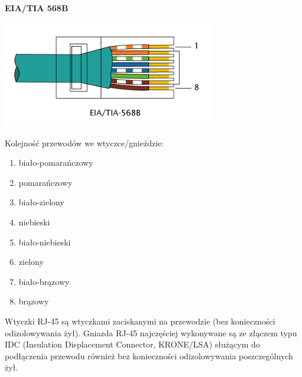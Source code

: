 \begin{minipage}{0.47\textwidth}
\begin{center}
{\noindent\large\bfseries EIA/TIA 568B}

{\noindent\includegraphics[width=0.7\textwidth,clip=true,trim={0, 4.5mm, 0, 0}]{RJ-45_TIA-568B_Right.png}}
\end{center}
\vspace{-0.3cm}

Kolejność przewodów we wtyczce/gnieździe:
\begin{enumerate}
	\item biało-pomarańczowy
	\item pomarańczowy
	\item biało-zielony
	\item niebieski
	\item biało-niebieski
	\item zielony
	\item biało-brązowy
	\item brązowy
\end{enumerate}
\end{minipage}
\vspace{0.3cm}

Wtyczki RJ-45 są wtyczkami zaciskanymi na przewodzie (bez konieczności odizolowywania żył). Gniazda RJ-45 najczęściej wykonywane są ze złączem typu IDC (Insulation Displacement Connector, KRONE/LSA) służącym do podłączenia przewodu również bez konieczności odizolowywania poszczególnych żył.
